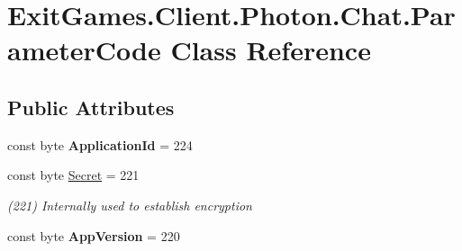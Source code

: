 \hypertarget{class_exit_games_1_1_client_1_1_photon_1_1_chat_1_1_parameter_code}{}\section{Exit\+Games.\+Client.\+Photon.\+Chat.\+Parameter\+Code Class Reference}
\label{class_exit_games_1_1_client_1_1_photon_1_1_chat_1_1_parameter_code}
\subsection*{Public Attributes}
\begin{DoxyCompactItemize}
\item 
const byte {\bfseries Application\+Id} = 224\hypertarget{class_exit_games_1_1_client_1_1_photon_1_1_chat_1_1_parameter_code_a3e0593b8bebedc54bb00c47d6b079409}{}\label{class_exit_games_1_1_client_1_1_photon_1_1_chat_1_1_parameter_code_a3e0593b8bebedc54bb00c47d6b079409}

\item 
const byte \hyperlink{class_exit_games_1_1_client_1_1_photon_1_1_chat_1_1_parameter_code_a8024f1b6758fb3fa6bcb54581965d7c9}{Secret} = 221
\begin{DoxyCompactList}\small\item\em (221) Internally used to establish encryption\end{DoxyCompactList}\item 
const byte {\bfseries App\+Version} = 220\hypertarget{class_exit_games_1_1_client_1_1_photon_1_1_chat_1_1_parameter_code_a2baac6007f6dfe71804735eb52225e9a}{}\label{class_exit_games_1_1_client_1_1_photon_1_1_chat_1_1_parameter_code_a2baac6007f6dfe71804735eb52225e9a}


\end{DoxyCompactItemize}
